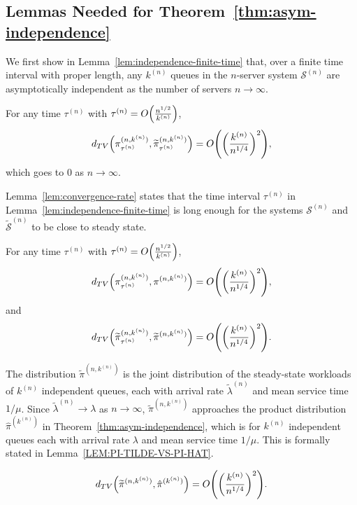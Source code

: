 \documentclass[sigconf]{acmart}
\newcommand{\supn}{^{(n)}}
\begin{document}
\subsection{Lemmas Needed for Theorem~\ref{thm:asym-independence}}
We first show in Lemma~\ref{lem:independence-finite-time} that, over a finite time interval with proper length, any $k\supn$ queues in the $n$-server system $\mathcal{S}\supn$ are asymptotically independent as the number of servers $n\to\infty$.
\begin{lemma}\label{lem:independence-finite-time}
For any time $\tau\supn$ with $\tau\supn=O\Bigl(\frac{n^{1/2}}{k\supn}\Bigr)$,
\begin{equation}\label{eq:independence-finite-time}
d_{TV}\Bigl(\pi_{\tau\supn}^{(n,k\supn)},\widetilde{\pi}_{\tau\supn}^{(n,k\supn)}\Bigr)=O\Biggl(\biggl(\frac{k\supn}{n^{1/4}}\biggr)^2\Biggr),
\end{equation}
which goes to $0$ as $n\to\infty$.
\end{lemma}

Lemma~\ref{lem:convergence-rate} states that the time interval $\tau\supn$ in Lemma~\ref{lem:independence-finite-time} is long enough for the systems $\mathcal{S}\supn$ and $\widetilde{\mathcal{S}}\supn$ to be close to steady state.
\begin{lemma}\label{lem:convergence-rate}
For any time $\tau\supn$ with $\tau\supn=O\Bigl(\frac{n^{1/2}}{k\supn}\Bigr)$,
\begin{equation}\label{eq:convergence}
d_{TV}\Bigl(\pi_{\tau\supn}^{(n,k\supn)},\pi^{(n,k\supn)}\Bigr)=O\Biggl(\biggl(\frac{k\supn}{n^{1/4}}\biggr)^2\Biggr),
\end{equation}
and
\begin{equation}\label{eq:convergence-independent}
d_{TV}\Bigl(\widetilde{\pi}_{\tau\supn}^{(n,k\supn)},\widetilde{\pi}^{(n,k\supn)}\Bigr)=O\Biggl(\biggl(\frac{k\supn}{n^{1/4}}\biggr)^2\Biggr).
\end{equation}
\end{lemma}


The distribution $\widetilde{\pi}^{(n,k\supn)}$ is the joint distribution of the steady-state workloads of $k\supn$ independent queues, each with arrival rate $\widetilde{\lambda}\supn$ and mean service time $1/\mu$.  Since $\widetilde{\lambda}\supn\to\lambda$ as $n\to\infty$, $\widetilde{\pi}^{(n,k\supn)}$ approaches the product distribution $\hat{\pi}^{(k\supn)}$ in Theorem~\ref{thm:asym-independence}, which is for $k\supn$ independent queues each with arrival rate $\lambda$ and mean service time $1/\mu$.  This is formally stated in Lemma~\ref{LEM:PI-TILDE-VS-PI-HAT}.
\begin{lemma}\label{LEM:PI-TILDE-VS-PI-HAT}
\begin{equation}\label{EQ:PI-TILDE-VS-PI-HAT}
d_{TV}\Bigl(\widetilde{\pi}^{(n,k\supn)},\hat{\pi}^{(k\supn)}\Bigr)=O\Biggl(\biggl(\frac{k\supn}{n^{1/4}}\biggr)^2\Biggr).
\end{equation}
\end{lemma}
\end{document}
